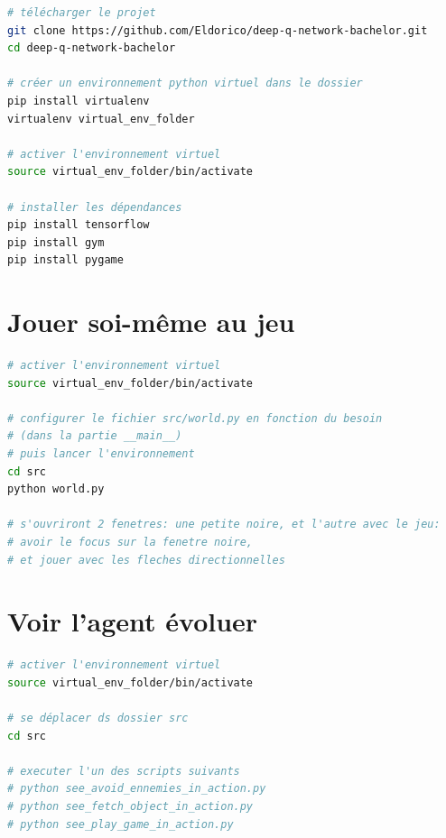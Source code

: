 \documentclass[11pt,a4paper]{report}
\begin{document}
  \begin{lstlisting}[language=bash]
# télécharger le projet
git clone https://github.com/Eldorico/deep-q-network-bachelor.git
cd deep-q-network-bachelor

# créer un environnement python virtuel dans le dossier
pip install virtualenv
virtualenv virtual_env_folder

# activer l'environnement virtuel
source virtual_env_folder/bin/activate

# installer les dépendances
pip install tensorflow
pip install gym
pip install pygame
  \end{lstlisting}  
  
 \section{Jouer soi-même au jeu}
  \begin{lstlisting}[language=bash]
# activer l'environnement virtuel
source virtual_env_folder/bin/activate

# configurer le fichier src/world.py en fonction du besoin
# (dans la partie __main__)
# puis lancer l'environnement
cd src
python world.py

# s'ouvriront 2 fenetres: une petite noire, et l'autre avec le jeu:
# avoir le focus sur la fenetre noire, 
# et jouer avec les fleches directionnelles
  \end{lstlisting}  
  
 \section{Voir l'agent évoluer}
  \begin{lstlisting}[language=bash]
# activer l'environnement virtuel
source virtual_env_folder/bin/activate

# se déplacer ds dossier src
cd src 

# executer l'un des scripts suivants
# python see_avoid_ennemies_in_action.py
# python see_fetch_object_in_action.py
# python see_play_game_in_action.py
  \end{lstlisting}  
\end{document}
